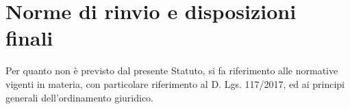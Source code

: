 \documentclass[legalpaper, 11pt]{exam}
\let\tempone\enumerate
\let\temptwo\endenumerate
\renewenvironment{enumerate}{\tempone\addtolength{\itemsep}{-0.45\baselineskip}}{\temptwo}
\begin{document}
{\section{Norme di rinvio e disposizioni finali}
\begin{enumerate}
 \item Per quanto non è previsto dal presente Statuto, si fa riferimento alle normative vigenti in materia, con particolare riferimento al D. Lgs. 117/2017, ed ai principi generali dell’ordinamento giuridico.
\end{enumerate}

}
\end{document}
